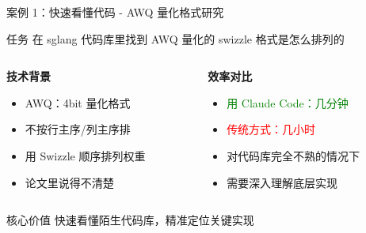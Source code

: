 \documentclass[aspectratio=169,xcolor=dvipsnames]{beamer}
\begin{document}
\begin{frame}{案例 1：快速看懂代码 - AWQ 量化格式研究}
  \begin{block}{任务}
    在 sglang 代码库里找到 AWQ 量化的 swizzle 格式是怎么排列的
  \end{block}

  \begin{columns}
    \begin{column}{0.48\textwidth}
      \textbf{技术背景}
      \begin{itemize}
        \item AWQ：4bit 量化格式
        \item 不按行主序/列主序排
        \item 用 Swizzle 顺序排列权重
        \item 论文里说得不清楚
      \end{itemize}
    \end{column}
    \begin{column}{0.48\textwidth}
      \textbf{效率对比}
      \begin{itemize}
        \item \textcolor{green}{用 Claude Code：几分钟}
        \item \textcolor{red}{传统方式：几小时}
        \item 对代码库完全不熟的情况下
        \item 需要深入理解底层实现
      \end{itemize}
    \end{column}
  \end{columns}

  \vspace{0.3cm}

  \begin{exampleblock}{核心价值}
    快速看懂陌生代码库，精准定位关键实现
  \end{exampleblock}
\end{frame}
\end{document}
